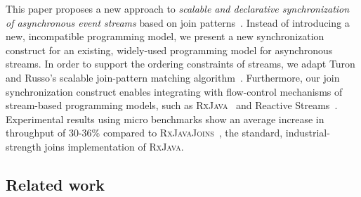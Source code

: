 \documentclass[runningheads]{llncs}
\begin{document}
\begin{sloppypar}
This paper proposes a new approach to {\em scalable and declarative synchronization
of asynchronous event streams} based on join patterns~\cite{Fournet:1996}. Instead of
introducing a new, incompatible programming model, we present a new
synchronization construct for an existing, widely-used programming model for
asynchronous streams. In order to support the ordering constraints of streams,
we adapt Turon and Russo's scalable join-pattern matching algorithm~\cite{Turon:2011}. Furthermore,
our join synchronization construct enables integrating with flow-control
mechanisms of stream-based programming models, such as \textsc{RxJava}~\cite{RxJava}
and Reactive Streams~\cite{ReactiveStreams}. Experimental results using micro
benchmarks show an average increase in throughput of 30-36\% compared to
\textsc{RxJavaJoins}~\cite{RxJavaJoins}, the standard, industrial-strength joins
implementation of \textsc{RxJava}.


\subsection{Related work}\label{sec:related}

\begin{table}[h]
\centering
{}
\caption{Related join-calculus implementations}
\label{tab:JoinCalculusImplementations}
\end{table}


\end{sloppypar}
\end{document}
